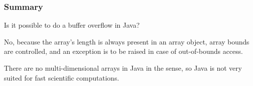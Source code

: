 \subsubsection{Summary}

Is it possible to do a buffer overflow in Java?

No, because the array's length is always present in an array object, 
array bounds are controlled, and an exception is to be raised in case of out-of-bounds access.


There are no multi-dimensional arrays in Java in the \CCpp sense, so Java is not very suited
for fast scientific computations.

%
